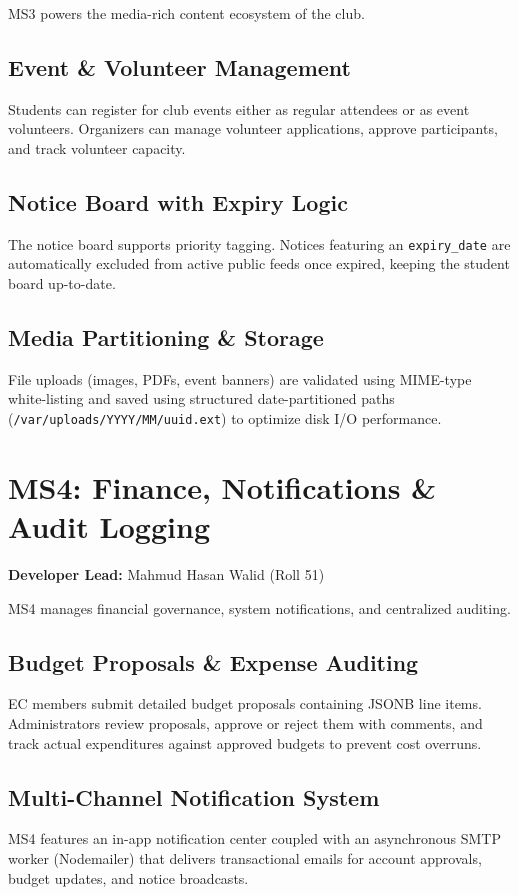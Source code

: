 \documentclass[12pt, a4paper]{report}
\begin{document}
MS3 powers the media-rich content ecosystem of the club.

\subsection{Event \& Volunteer Management}
Students can register for club events either as regular attendees or as event volunteers. Organizers can manage volunteer applications, approve participants, and track volunteer capacity.

\subsection{Notice Board with Expiry Logic}
The notice board supports priority tagging. Notices featuring an \texttt{expiry\_date} are automatically excluded from active public feeds once expired, keeping the student board up-to-date.

\subsection{Media Partitioning \& Storage}
File uploads (images, PDFs, event banners) are validated using MIME-type white-listing and saved using structured date-partitioned paths (\texttt{/var/uploads/YYYY/MM/uuid.ext}) to optimize disk I/O performance.

\section{MS4: Finance, Notifications \& Audit Logging}
\textbf{Developer Lead:} Mahmud Hasan Walid (Roll 51)

MS4 manages financial governance, system notifications, and centralized auditing.

\subsection{Budget Proposals \& Expense Auditing}
EC members submit detailed budget proposals containing JSONB line items. Administrators review proposals, approve or reject them with comments, and track actual expenditures against approved budgets to prevent cost overruns.

\subsection{Multi-Channel Notification System}
MS4 features an in-app notification center coupled with an asynchronous SMTP worker (Nodemailer) that delivers transactional emails for account approvals, budget updates, and notice broadcasts.
\end{document}
